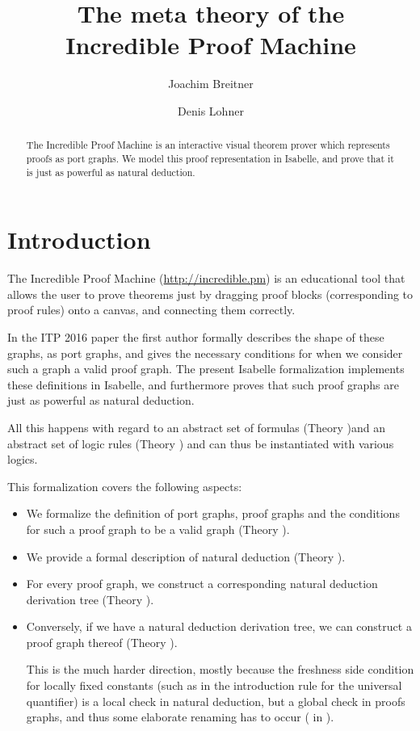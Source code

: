 \documentclass[11pt,a4paper,parskip=half]{scrartcl}
\begin{document}
\title{The meta theory of the\\ Incredible Proof Machine}
\author{Joachim Breitner \and Denis Lohner}
\maketitle

\begin{abstract}
\noindent
The Incredible Proof Machine is an interactive visual theorem prover which represents proofs as
port graphs. We model this proof representation in Isabelle, and prove that it is just
as powerful as natural deduction.
\end{abstract}

\tableofcontents

\section{Introduction}

The Incredible Proof Machine (\url{http://incredible.pm}) is an educational tool that allows the user to
prove theorems just by dragging proof blocks (corresponding to proof rules) onto a canvas, and connecting them
correctly.

In the ITP 2016 paper \cite{incredible} the first author formally describes the
shape of these graphs, as port graphs, and gives the necessary conditions for
when we consider such a graph a valid proof graph. The present Isabelle
formalization implements these definitions in Isabelle, and furthermore proves
that such proof graphs are just as powerful as natural deduction.

All this happens with regard to an abstract set of formulas (Theory
)and an abstract set of logic rules (Theory
) and can thus be instantiated with various logics.

This formalization covers the following aspects:
\begin{itemize}
\item We formalize the definition of port graphs, proof graphs and the conditions for such a proof
      graph to be a valid graph (Theory ).
\item We provide a formal description of natural deduction (Theory ).
\item For every proof graph, we construct a corresponding natural deduction derivation tree
      (Theory  ).
\item Conversely, if we have a natural deduction derivation tree, we can construct a proof graph
      thereof (Theory ).
      
      This is the much harder direction, mostly because the freshness side condition for locally
      fixed constants (such as in the introduction rule for the universal quantifier) is a local
      check in natural deduction, but a global check in proofs graphs, and thus some elaborate
      renaming has to occur ( in ).
\end{itemize}
\end{document}
